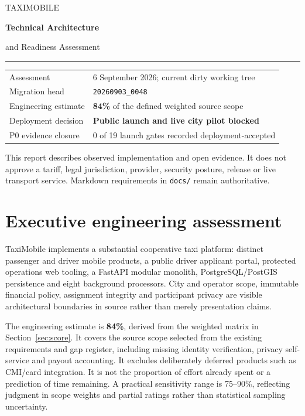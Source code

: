 \documentclass[11pt,a4paper]{article}
\newcommand{\src}[1]{{\small\nolinkurl{#1}}}
\begin{document}
\RaggedRight
\begin{titlepage}
\color{Navy}
{\Large TAXIMOBILE\par}\vspace{16mm}
{\Huge\bfseries Technical Architecture\par and Readiness Assessment\par}
\vspace{8mm}{\Large Cooperative taxi infrastructure\par}
\vspace{6mm}{\large Domain invariants, transaction boundaries, client integration,\par operational gates and delivery workflow\par}
\vspace{14mm}\hrule\vspace{6mm}
\begin{tabularx}{\textwidth}{@{}lX@{}}
Assessment & 6 September 2026; current dirty working tree \\
Migration head & \src{20260903_0048} \\
Engineering estimate & \textbf{84\%} of the defined weighted source scope \\
Deployment decision & \textbf{Public launch and live city pilot blocked} \\
P0 evidence closure & 0 of 19 launch gates recorded deployment-accepted \\
\end{tabularx}
\vfill
{\small This report describes observed implementation and open evidence. It does not approve a tariff, legal jurisdiction, provider, security posture, release or live transport service. Markdown requirements in \src{docs/} remain authoritative.}
\end{titlepage}
\tableofcontents\clearpage

\section{Executive engineering assessment}
TaxiMobile implements a substantial cooperative taxi platform: distinct passenger
and driver mobile products, a public driver applicant portal, protected operations
web tooling, a FastAPI modular monolith, PostgreSQL/PostGIS persistence and eight
background processors. City and operator scope, immutable financial policy,
assignment integrity and participant privacy are visible architectural boundaries
in source rather than merely presentation claims.

The engineering estimate is \textbf{84\%}, derived from the weighted matrix in
Section~\ref{sec:score}. It covers the source scope selected from the existing
requirements and gap register, including missing identity verification, privacy
self-service and payout accounting. It excludes deliberately deferred products
such as CMI/card integration. It is not the proportion of effort already spent
or a prediction of time remaining. A practical sensitivity range is 75--90\%,
reflecting judgment in scope weights and partial ratings rather than statistical
sampling uncertainty.
\end{document}
